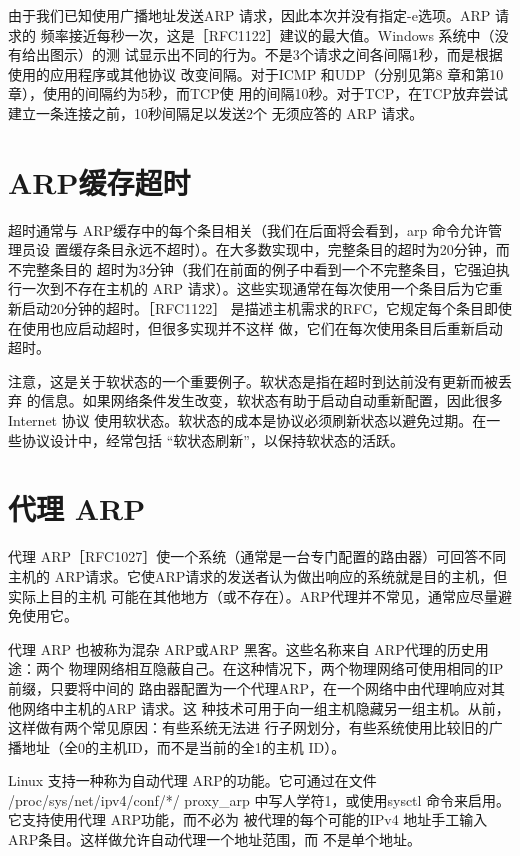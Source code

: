 由于我们已知使用广播地址发送ARP 请求，因此本次并没有指定-e选项。ARP 请求的
频率接近每秒一次，这是［RFC1122］建议的最大值。Windows 系统中（没有给出图示）的测
试显示出不同的行为。不是3个请求之间各间隔1秒，而是根据使用的应用程序或其他协议
改变间隔。对于ICMP 和UDP（分别见第8 章和第10章），使用的间隔约为5秒，而TCP使
用的间隔10秒。对于TCP，在TCP放弃尝试建立一条连接之前，10秒间隔足以发送2个
无须应答的 ARP 请求。

\section{ARP缓存超时}

超时通常与 ARP缓存中的每个条目相关（我们在后面将会看到，arp 命令允许管理员设
置缓存条目永远不超时）。在大多数实现中，完整条目的超时为20分钟，而不完整条目的
超时为3分钟（我们在前面的例子中看到一个不完整条目，它强迫执行一次到不存在主机的
ARP 请求）。这些实现通常在每次使用一个条目后为它重新启动20分钟的超时。［RFC1122］
是描述主机需求的RFC，它规定每个条目即使在使用也应启动超时，但很多实现并不这样
做，它们在每次使用条目后重新启动超时。

注意，这是关于软状态的一个重要例子。软状态是指在超时到达前没有更新而被丢弃
的信息。如果网络条件发生改变，软状态有助于启动自动重新配置，因此很多 Internet 协议
使用软状态。软状态的成本是协议必须刷新状态以避免过期。在一些协议设计中，经常包括
“软状态刷新”，以保持软状态的活跃。

\section{代理 ARP}

代理 ARP［RFC1027］使一个系统（通常是一台专门配置的路由器）可回答不同主机的
ARP请求。它使ARP请求的发送者认为做出响应的系统就是目的主机，但实际上目的主机
可能在其他地方（或不存在）。ARP代理并不常见，通常应尽量避免使用它。

代理 ARP 也被称为混杂 ARP或ARP 黑客。这些名称来自 ARP代理的历史用途：两个
物理网络相互隐蔽自己。在这种情况下，两个物理网络可使用相同的IP前缀，只要将中间的
路由器配置为一个代理ARP，在一个网络中由代理响应对其他网络中主机的ARP 请求。这
种技术可用于向一组主机隐藏另一组主机。从前，这样做有两个常见原因：有些系统无法进
行子网划分，有些系统使用比较旧的广播地址（全0的主机ID，而不是当前的全1的主机
ID）。

Linux 支持一种称为自动代理 ARP的功能。它可通过在文件 /proc/sys/net/ipv4/conf/*/
proxy\_arp 中写人学符1，或使用sysctl 命令来启用。它支持使用代理 ARP功能，而不必为
被代理的每个可能的IPv4 地址手工输入 ARP条目。这样做允许自动代理一个地址范围，而
不是单个地址。

